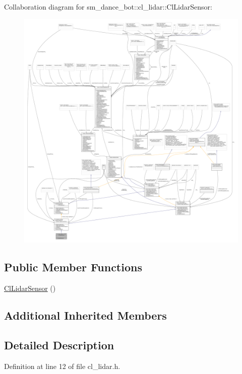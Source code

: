 Collaboration diagram for sm\+\_\+dance\+\_\+bot\+:\+:cl\+\_\+lidar\+:\+:Cl\+Lidar\+Sensor\+:
\nopagebreak
\begin{figure}[H]
\begin{center}
\leavevmode
\includegraphics[width=350pt]{classsm__dance__bot_1_1cl__lidar_1_1ClLidarSensor__coll__graph}
\end{center}
\end{figure}
\subsection*{Public Member Functions}
\begin{DoxyCompactItemize}
\item 
\hyperlink{classsm__dance__bot_1_1cl__lidar_1_1ClLidarSensor_a1d3da358f132075aa25d4e647fc93924}{Cl\+Lidar\+Sensor} ()
\end{DoxyCompactItemize}
\subsection*{Additional Inherited Members}


\subsection{Detailed Description}


Definition at line 12 of file cl\+\_\+lidar.\+h.



